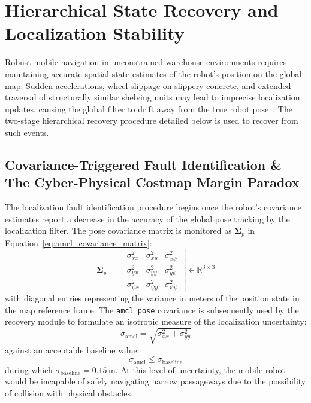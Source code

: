 \section{Hierarchical State Recovery and Localization Stability}\label{sec:ch6_hierarchical_recovery}

Robust mobile navigation in unconstrained warehouse environments requires maintaining accurate spatial state estimates of the robot's position on the global map. Sudden accelerations, wheel slippage on slippery concrete, and extended traversal of structurally similar shelving units may lead to imprecise localization updates, causing the global filter to drift away from the true robot pose~\cite{fox2003kld}. The two-stage hierarchical recovery procedure detailed below is used to recover from such events.

\subsection{Covariance-Triggered Fault Identification \& The Cyber-Physical Costmap Margin Paradox}\label{sec:ch6_margin_paradox}

The localization fault identification procedure begins once the robot's covariance estimates report a decrease in the accuracy of the global pose tracking by the localization filter. The pose covariance matrix is monitored as $\mathbf{\Sigma}_p$ in Equation~\eqref{eq:amcl_covariance_matrix}:
\begin{equation} \mathbf{\Sigma}_p = \begin{bmatrix} \sigma_{xx}^2 & \sigma_{xy}^2 & \sigma_{x\psi}^2 \\ \sigma_{yx}^2 & \sigma_{yy}^2 & \sigma_{y\psi}^2 \\ \sigma_{\psi x}^2 & \sigma_{\psi y}^2 & \sigma_{\psi\psi}^2 \end{bmatrix} \in \mathbb{R}^{3 \times 3} \label{eq:amcl_covariance_matrix} \end{equation}
with diagonal entries representing the variance in meters of the position state in the map reference frame. The \texttt{amcl\_pose} covariance is subsequently used by the recovery module to formulate an isotropic measure of the localization uncertainty:
\begin{equation} \sigma_{\text{amcl}} = \sqrt{\sigma_{xx}^2 + \sigma_{yy}^2} \label{eq:sigma_amcl_derivation} \end{equation}
against an acceptable baseline value:
\begin{equation} \sigma_{\text{amcl}} \le \sigma_{\text{baseline}} \label{eq:strict_uncertainty_threshold} \end{equation}
during which $\sigma_{\text{baseline}} = 0.15\,\text{m}$. At this level of uncertainty, the mobile robot would be incapable of safely navigating narrow passageways due to the possibility of collision with physical obstacles.

